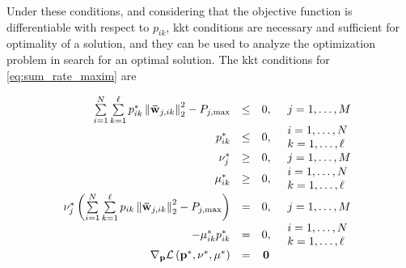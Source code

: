 Under these conditions, and considering that the objective function is
differentiable with respect to $p_{ik}$, \gls{kkt} conditions \cite{boyd_convex}
are necessary and sufficient for optimality of a solution, and they can be used
to analyze the optimization problem in search for an optimal solution. The
\gls{kkt} conditions for \eqref{eq:sum_rate_maxim} are

\begin{equation} \label{eq:kkt_conditions}
\begin{array}{rccl}
	\sum\limits_{i = 1}^N \sum\limits_{k = 1}^\ell p_{ik}^\ast \left\|
    \mathbf{\bar{w}}_{j,ik} \right\|_2^2 - P_{j,\max} & \leq & 0, &
    \begin{array}{l}
        j = 1, \ldots, M
    \end{array}\\

    p_{ik}^\ast &\leq & 0, &
	\begin{array}{l}
        i = 1, \ldots, N\\
        k = 1, \ldots, \ell
	\end{array}\\

    \nu_j^\ast & \geq & 0, &
    \begin{array}{l}
        j = 1, \ldots, M
    \end{array}\\

    \mu_{ik}^\ast & \geq & 0, &
	\begin{array}{l}
        i = 1, \ldots, N\\
        k = 1, \ldots, \ell
	\end{array}\\

    \nu_j^\ast\left(\sum\limits_{i = 1}^N \sum\limits_{k = 1}^\ell p_{ik}
    \left\|\mathbf{\bar{w}}_{j,ik} \right\|_2^2 - P_{j,\max} \right) & = & 0, &
    \begin{array}{l}
        j = 1, \ldots, M
    \end{array}\\

    -\mu_{ik}^\ast p_{ik}^\ast & = & 0, &
	\begin{array}{l}
        i = 1, \ldots, N\\
        k = 1, \ldots, \ell
	\end{array}\\

    \mathbf{\nabla}_{\mathbf{p}} \mathcal{L}\left(\mathbf{p}^\ast, \mathbf{\nu}^\ast,
        \mathbf{\mu}^\ast \right) & = & \mathbf{0}

\end{array}
\end{equation}

